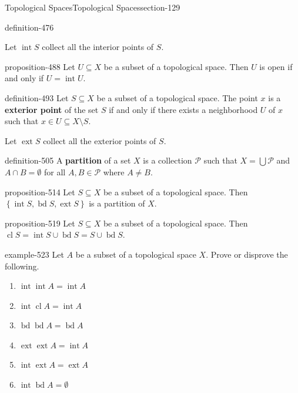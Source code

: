 \documentclass[oneside,10pt,]{article}
\newcommand{\terminology}[1]{\textbf{#1}}
\newcommand{\mc}{\mathcal}
\newcommand{\cl}{\operatorname{cl}}
\renewcommand{\int}{\operatorname{int}}
\newcommand{\ext}{\operatorname{ext}}
\newcommand{\bd}{\operatorname{bd}}
\newcommand{\setList}[1]{\left\{#1\right\}}
\begin{document}
\begin{sectionptx}{Topological Spaces}{}{Topological Spaces}{}{}{section-129}
\begin{definition}{}{definition-476}
\par
\hypertarget{p-485}{}%
Let \(\int S\) collect all the interior points of \(S\).%
\end{definition}
\begin{proposition}{}{}{proposition-488}%
\hypertarget{p-489}{}%
Let \(U\subseteq X\) be a subset of a topological space. Then \(U\) is open if and only if \(U=\int U\).%
\end{proposition}
\begin{definition}{}{definition-493}%
\hypertarget{p-494}{}%
Let \(S\subseteq X\) be a subset of a topological space. The point \(x\) is a \terminology{exterior point} of the set \(S\) if and only if there exists a neighborhood \(U\) of \(x\) such that \(x\in U\subseteq X\setminus S\).%
\par
\hypertarget{p-502}{}%
Let \(\ext S\) collect all the exterior points of \(S\).%
\end{definition}
\begin{definition}{}{definition-505}%
\hypertarget{p-506}{}%
A \terminology{partition} of a set \(X\) is a collection \(\mc P\) such that \(X=\bigcup\mc P\) and \(A\cap B=\emptyset\) for all \(A,B\in\mc P\) where \(A\not=B\).%
\end{definition}
\begin{proposition}{}{}{proposition-514}%
\hypertarget{p-515}{}%
Let \(S\subseteq X\) be a subset of a topological space. Then \(\setList{\int S,\bd S,\ext S}\) is a partition of \(X\).%
\end{proposition}
\begin{proposition}{}{}{proposition-519}%
\hypertarget{p-520}{}%
Let \(S\subseteq X\) be a subset of a topological space. Then \(\cl S=\int S\cup\bd S=S\cup\bd S\).%
\end{proposition}
\begin{example}{}{example-523}%
\hypertarget{p-524}{}%
Let \(A\) be a subset of a topological space \(X\). Prove or disprove the following.%
\leavevmode%
\begin{enumerate}
\item\hypertarget{li-528}{}\(\int\int A=\int A\)%
\item\hypertarget{li-530}{}\(\int\cl A=\int A\)%
\item\hypertarget{li-532}{}\(\bd\bd A=\bd A\)%
\item\hypertarget{li-534}{}\(\ext\ext A=\int A\)%
\item\hypertarget{li-536}{}\(\int\ext A=\ext A\)%
\item\hypertarget{li-538}{}\(\int\bd A=\emptyset\)%

\end{enumerate}
\end{example}
\end{sectionptx}
\end{document}
